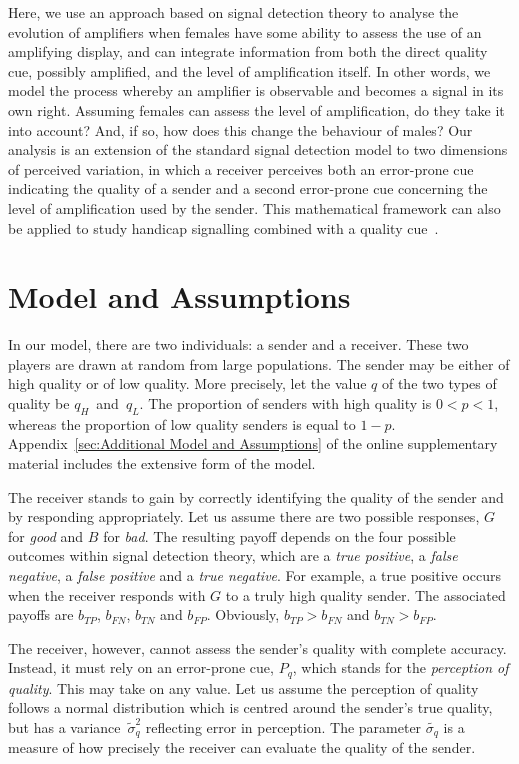 \documentclass[a4paper,12pt]{article}
\numberwithin{equation}{section}
\numberwithin{figure}{section}
\begin{document}
Here, we use an approach based on signal detection theory to analyse the evolution of amplifiers when females have some ability to assess the use of an amplifying display, and can integrate information from both the direct quality cue, possibly amplified, and the level of amplification itself. In other words, we model the process whereby an amplifier is observable and becomes a signal in its own right. Assuming females can assess the level of amplification, do they take it into account? And, if so, how does this change the behaviour of males? Our analysis is an extension of the standard signal detection model to two dimensions of perceived variation, in which a receiver perceives both an error-prone cue indicating the quality of a sender and a second error-prone cue concerning the level of amplification used by the sender. This mathematical framework can also be applied to study handicap signalling combined with a quality cue~\cite{Bogaardt2016}.

\newpage


\section{Model and Assumptions}
\label{sec:Model and Assumptions}

In our model, there are two individuals: a sender and a receiver. These two players are drawn at random from large populations. The sender may be either of high quality or of low quality. More precisely, let the value $q$ of the two types of quality be $q_{H}$~and~$q_{L}$. The proportion of senders with high quality is $0<p<1$, whereas the proportion of low quality senders is equal to $1-p$. Appendix~\ref{sec:Additional Model and Assumptions} of the online supplementary material includes the extensive form of the model.

The receiver stands to gain by correctly identifying the quality of the sender and by responding appropriately. Let us assume there are two possible responses, $G$ for \textit{good} and $B$ for \textit{bad}. The resulting payoff depends on the four possible outcomes within signal detection theory, which are a \textit{true positive}, a \textit{false negative}, a \textit{false positive} and a \textit{true negative}. For example, a true positive occurs when the receiver responds with $G$ to a truly high quality sender. The associated payoffs are $b_{TP}$, $b_{FN}$, $b_{TN}$ and $b_{FP}$. Obviously, $b_{TP}>b_{FN}$ and $b_{TN}>b_{FP}$.

The receiver, however, cannot assess the sender's quality with complete accuracy. Instead, it must rely on an error-prone cue, $P_{q}$, which stands for the \textit{perception of quality}. This may take on any value. Let us assume the perception of quality follows a normal distribution which is centred around the sender's true quality, but has a variance~$\tilde{\sigma}^{2}_{q}$ reflecting error in perception. The parameter $\tilde{\sigma_{q}}$ is a measure of how precisely the receiver can evaluate the quality of the sender.
\end{document}
